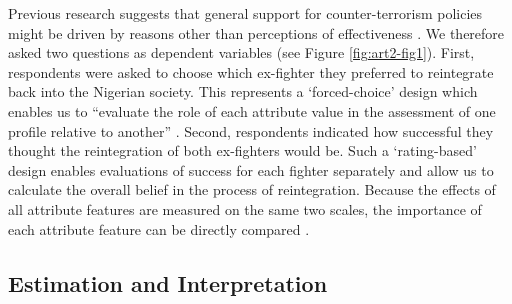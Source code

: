 Previous research suggests that general support for counter-terrorism policies might be driven by reasons other than perceptions of effectiveness \citep{Clubb2019}. We therefore asked two questions as dependent variables (see Figure \ref{fig:art2-fig1}). First, respondents were asked to choose which ex-fighter they preferred to reintegrate back into the Nigerian society. This represents a `forced-choice' design which enables us to ``evaluate the role of each attribute value in the assessment of one profile relative to another'' \citep[][p. 4]{Hainmueller2014a}. Second, respondents indicated how successful they thought the reintegration of both ex-fighters would be. Such a `rating-based' design enables evaluations of success for each fighter separately and allow us to calculate the overall belief in the process of reintegration. Because the effects of all attribute features are measured on the same two scales, the importance of each attribute feature can be directly compared \cite[][but see Leeper et al., 2019]{Hainmueller2014a}.


\subsection{Estimation and Interpretation}

